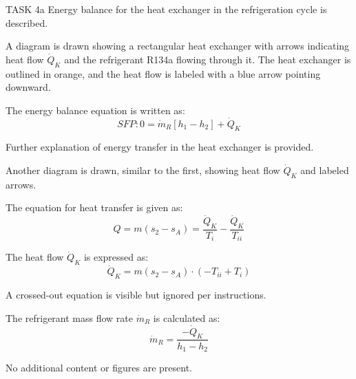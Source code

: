 TASK 4a  
Energy balance for the heat exchanger in the refrigeration cycle is described.  

A diagram is drawn showing a rectangular heat exchanger with arrows indicating heat flow \( \dot{Q}_K \) and the refrigerant R134a flowing through it. The heat exchanger is outlined in orange, and the heat flow is labeled with a blue arrow pointing downward.  

The energy balance equation is written as:  
\[
SFP: 0 = \dot{m}_R [h_1 - h_2] + \dot{Q}_K
\]  

Further explanation of energy transfer in the heat exchanger is provided.  

Another diagram is drawn, similar to the first, showing heat flow \( \dot{Q}_K \) and labeled arrows.  

The equation for heat transfer is given as:  
\[
Q = m(s_2 - s_A) = \frac{\dot{Q}_K}{T_i} - \frac{\dot{Q}_K}{T_{ii}}
\]  

The heat flow \( \dot{Q}_K \) is expressed as:  
\[
\dot{Q}_K = m(s_2 - s_A) \cdot (-T_{ii} + T_{i})
\]  

A crossed-out equation is visible but ignored per instructions.  

The refrigerant mass flow rate \( \dot{m}_R \) is calculated as:  
\[
\dot{m}_R = \frac{-\dot{Q}_K}{h_1 - h_2}
\]  

No additional content or figures are present.